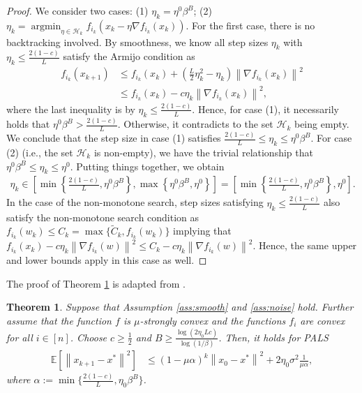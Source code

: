 \documentclass{article}
\newtheorem{theorem}{Theorem}
\newcommand{\EE}{\mathbb{E}}
\newcommand{\norm}[1]{\left \lVert #1 \right \rVert}
\DeclareMathOperator{\argmin}{argmin}
\begin{document}
\begin{proof}
    We consider two cases: (1) $\eta_k = \eta^{0} \beta^B$; (2) $\eta_k = \argmin_{\eta \in \mathcal{H}_k} f_{i_k}(x_k - \eta \nabla f_{i_k}(x_k))$. For the first case, there is no backtracking involved. By  smoothness, we know all step sizes $\eta_k$ with $\eta_k \leq \frac{2(1-c)}{L}$ satisfy the Armijo condition as
    \begin{align*}
        f_{i_k}(x_{k+1}) &\leq f_{i_k}(x_k) + (\frac{L}{2} \eta_k^2 - \eta_k) \norm{\nabla f_{i_k}(x_k)}^2 \\ 
        &\leq f_{i_k}(x_k) - c \eta_k \norm{\nabla f_{i_k}(x_k)}^2,
    \end{align*}
    where the last inequality is by $\eta_k \leq \frac{2(1-c)}{L}$. Hence, for case (1), it necessarily holds that $\eta^0 \beta^B > \frac{2(1-c)}{L}$. Otherwise, it contradicts to the set $\mathcal{H}_k$ being empty. We conclude that the step size in case (1) satisfies $\frac{2(1-c)}{L} \leq \eta_k \leq \eta^0 \beta^B$. For case (2) (i.e., the set $\mathcal{H}_k$ is non-empty), we have the trivial relationship that $\eta^0\beta^B \leq \eta_k \leq \eta^0$. Putting things together, we obtain
    \begin{align*}
        \eta_k \in \left[ \min\left\{ \frac{2(1-c)}{L}, \eta^0 \beta^B\right\}, \max\left\{\eta^0 \beta^B, \eta^0 \right\}\right] = \left[ \min\left\{ \frac{2(1-c)}{L}, \eta^0 \beta^B\right\},  \eta^0 \right]. 
    \end{align*}
    In the case of the non-monotone search, step sizes satisfying $\eta_k \leq \frac{2(1-c)}{L}$ also satisfy the non-monotone search condition as $f_{i_k}(w_k) \leq C_k = \max \{ \tilde{C}_k, f_{i_k}(w_k)\}$ implying that $f_{i_k}(x_k) - c \eta_k \norm{\nabla f_{i_k}(w)}^2 \leq C_k - c \eta_k \norm{\nabla f_{i_k}(w)}^2$. Hence, the same upper and lower bounds apply in this case as well. 
\end{proof}

The proof of Theorem \ref{thm:app_thm1} is adapted from \citet{loizou2021stochastic}.
\begin{theorem} \label{thm:app_thm1} Suppose that Assumption \ref{ass:smooth} and \ref{ass:noise} hold. Further assume that the function $f$ is $\mu$-strongly convex and the functions $f_i$ are convex for all $i \in [n]$. Choose $c \geq \frac{1}{2}$ and $B \geq \frac{\log(2 \eta_0 L c)}{\log(1/\beta)}$. Then, it holds for \textit{PALS}
\begin{align*}
    \EE[\norm{x_{k+1}- x^*}^2] 
    &\leq (1 - \mu\alpha)^k \norm{x_{0}- x^*}^2 + 2 \eta_0 \sigma^2 \frac{1}{\mu \alpha}, 
\end{align*}
where $\alpha:=\min\{ \frac{2(1-c)}{L}, \eta_0 \beta^B\}$.     
\end{theorem}
\end{document}
